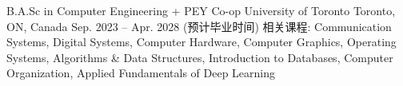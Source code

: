 
\begin{cventries}

  \cventry
  {B.A.Sc in Computer Engineering + PEY Co-op} %
  {University of Toronto} %
  {Toronto, ON, Canada} %
  {Sep. 2023 -- Apr. 2028 (预计毕业时间)} %
  {
    相关课程: Communication Systems,
    Digital Systems,
    Computer Hardware,
    Computer Graphics,
    Operating Systems,
    Algorithms \& Data Structures,
    Introduction to Databases,
    Computer Organization,
    Applied Fundamentals of Deep Learning
  }

\end{cventries}
